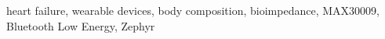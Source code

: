\documentclass[diplomskirad, numeric, utf8, times]{fer}
\begin{document}
\begin{keywords}
heart failure, wearable devices, body composition, bioimpedance, MAX30009, Bluetooth Low Energy, Zephyr 
\end{keywords}



\backmatter


\end{document}
